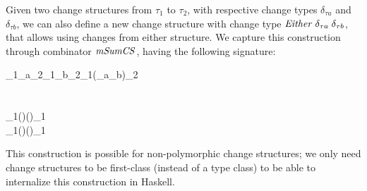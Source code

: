 Given two change structures from \ensuremath{\tau_{1}} to \ensuremath{\tau_{2}}, with respective change types
\ensuremath{\delta_{\tau a}} and \ensuremath{\delta_{\tau b}}, we can also define a new change structure with change type
\ensuremath{\Conid{Either}\;\delta_{\tau a}\;\delta_{\tau b}}, that allows using changes from either structure.
We capture this construction through combinator \ensuremath{\Varid{mSumCS}}, having the following
signature:
\begin{hscode}\SaveRestoreHook
{}%
%
%
%
\>[B]{}\mathrel{:\mkern-1mu:}\;\tau_{1}\;\delta_{\tau a}\;\tau_{2}\to {}\;\tau_{1}\;\delta_{\tau b}\;\tau_{2}\to {}\;\tau_{1}\;(\;\delta_{\tau a}\;\delta_{\tau b})\;\tau_{2}{}\<[E]%
\\[\blanklineskip]%
\>[B]{}\;\;\mathrel{=}\;\<[E]%
\\
\>[B]{}\<[3]%
\>[3]{}\<[E]%
\\
\>[3]{}\<[5]%
\>[5]{}\;_{1}\;(\;)\mathrel{=}(\myboxplus)\;\;_{1}\;\<[E]%
\\
\>[3]{}\<[5]%
\>[5]{}\;_{1}\;(\;)\mathrel{=}(\myboxplus)\;\;_{1}\;\<[E]%
\ColumnHook
\end{hscode}\resethooks
This construction is possible for non-polymorphic change structures; we only
need change structures to be first-class (instead of a type class) to be able to internalize this construction in Haskell.


